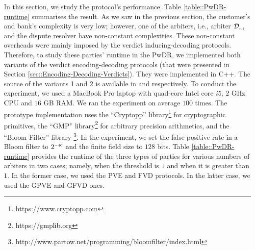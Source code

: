 In this section, we study the  protocol's performance.   Table \ref{table::PwDR-runtime} summarises the result.  As we saw  in the previous section, the customer's and bank's complexity is very low; however, one of the arbiters, i.e., arbiter $\mathcal{D}_{\scriptscriptstyle n}$, and the dispute resolver have non-constant complexities.  These non-constant  overheads were mainly imposed by the verdict inducing-decoding protocols. Therefore, to study these parties' runtime in the PwDR, we  implemented both variants of the verdict encoding-decoding protocols (that were presented in Section  \ref{sec::Encoding-Decoding-Verdicts}). They  were implemented in C++. The source of the variants 1 and 2 is available in \cite{variant-1} and \cite{variant-2} respectively. To conduct the experiment, we used a MacBook Pro laptop with quad-core Intel core $i5$, $2$ GHz CPU and $16$ GB RAM. We ran the experiment on average $100$ times. The prototype implementation uses the ``Cryptopp'' library\footnote{https://www.cryptopp.com}  for cryptographic primitives, the ``GMP'' library\footnote{https://gmplib.org} for arbitrary precision arithmetics, and the ``Bloom Filter'' library \footnote{http://www.partow.net/programming/bloomfilter/index.html}. In the experiment, we set the false-positive rate in a Bloom filter to $2^{\scriptscriptstyle -40}$ and  the finite field size to $128$ bits. Table \ref{table::PwDR-runtime} provides the runtime of the three types of parties for various numbers of arbiters in two cases; namely, when the threshold is $1$ and when it is greater than $1$. In the former case, we used the PVE and FVD protocols.  In the latter case, we used the GPVE and GFVD ones. 






